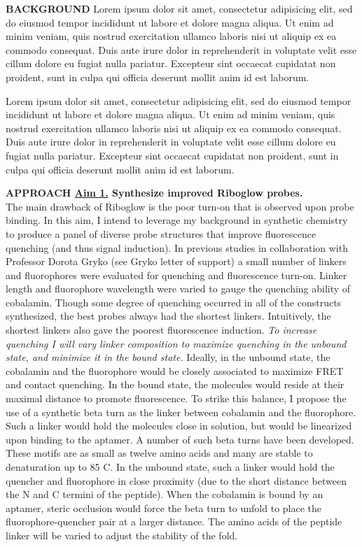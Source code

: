 \textbf{BACKGROUND}
Lorem ipsum dolor sit amet, consectetur adipisicing elit, sed do eiusmod tempor incididunt ut labore et dolore magna aliqua. Ut enim ad minim veniam, quis nostrud exercitation ullamco laboris nisi ut aliquip ex ea commodo consequat. Duis aute irure dolor in reprehenderit in voluptate velit esse cillum dolore eu fugiat nulla pariatur. Excepteur sint occaecat cupidatat non proident, sunt in culpa qui officia deserunt mollit anim id est laborum.

Lorem ipsum dolor sit amet, consectetur adipisicing elit, sed do eiusmod tempor incididunt ut labore et dolore magna aliqua. Ut enim ad minim veniam, quis nostrud exercitation ullamco laboris nisi ut aliquip ex ea commodo consequat. Duis aute irure dolor in reprehenderit in voluptate velit esse cillum dolore eu fugiat nulla pariatur. Excepteur sint occaecat cupidatat non proident, sunt in culpa qui officia deserunt mollit anim id est laborum.

\textbf{APPROACH \underline{Aim 1.} Synthesize improved Riboglow probes.}\\
The main drawback of Riboglow is the poor turn-on that is observed upon probe binding. In this aim, I intend to leverage my background in synthetic chemistry to produce a panel of diverse probe structures that improve fluorescence quenching (and thus signal induction). In previous studies in collaboration with Professor Dorota Gryko (see Gryko letter of support) a small number of linkers and fluorophores were evaluated for quenching and fluorescence turn-on. Linker length and fluorophore wavelength were varied to gauge the quenching ability of cobalamin. Though some degree of quenching occurred in all of the constructs synthesized, the best probes always had the shortest linkers. Intuitively, the shortest linkers also gave the poorest fluorescence induction.
\textit{To increase quenching I will vary linker composition to maximize quenching in the unbound state, and minimize it in the bound state.} Ideally, in the unbound state, the cobalamin and the fluorophore would be closely associated to maximize FRET and contact quenching.\cite{LeeDesignSynthesisCharacterization2009} In the bound state, the molecules would reside at their maximal distance to promote fluorescence. To strike this balance, I propose the use of a synthetic beta turn as the linker between cobalamin and the fluorophore. Such a linker would hold the molecules close in solution, but would be linearized upon binding to the aptamer. A number of such beta turns have been developed. These motifs are as small as twelve amino acids and many are stable to denaturation up to 85 C.\cite{KierProbingLowerSize2008} In the unbound state, such a linker would hold the quencher and fluorophore in close proximity (due to the short distance between the N and C termini of the peptide). When the cobalamin is bound by an aptamer, steric occlusion would force the beta turn to unfold to place the fluorophore-quencher pair at a larger distance. The amino acids of the peptide linker will be varied to adjust the stability of the fold.

